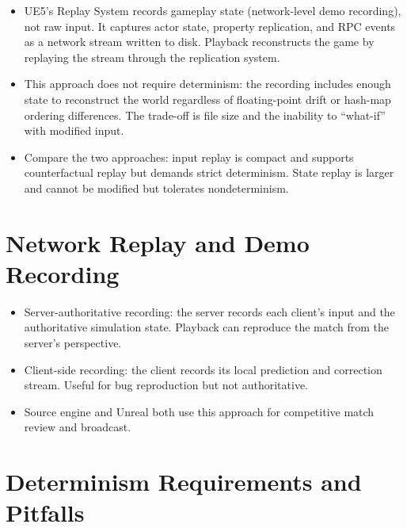 \documentclass[
  11pt,
  letterpaper,
  DIV=11,
  numbers=noendperiod,
  twoside,
  open=right]{scrreprt}
\providecommand{\tightlist}{%
  \setlength{\itemsep}{0pt}\setlength{\parskip}{0pt}}
\begin{document}
\begin{itemize}
\tightlist
\item
  UE5's Replay System records gameplay state (network-level demo
  recording), not raw input. It captures actor state, property
  replication, and RPC events as a network stream written to disk.
  Playback reconstructs the game by replaying the stream through the
  replication system.
\item
  This approach does not require determinism: the recording includes
  enough state to reconstruct the world regardless of floating-point
  drift or hash-map ordering differences. The trade-off is file size and
  the inability to ``what-if'' with modified input.
\item
  Compare the two approaches: input replay is compact and supports
  counterfactual replay but demands strict determinism. State replay is
  larger and cannot be modified but tolerates nondeterminism.
\end{itemize}

\section{Network Replay and Demo
Recording}\label{network-replay-and-demo-recording}

\begin{itemize}
\tightlist
\item
  Server-authoritative recording: the server records each client's input
  and the authoritative simulation state. Playback can reproduce the
  match from the server's perspective.
\item
  Client-side recording: the client records its local prediction and
  correction stream. Useful for bug reproduction but not authoritative.
\item
  Source engine and Unreal both use this approach for competitive match
  review and broadcast.
\end{itemize}

\section{Determinism Requirements and
Pitfalls}\label{determinism-requirements-and-pitfalls}
\end{document}
